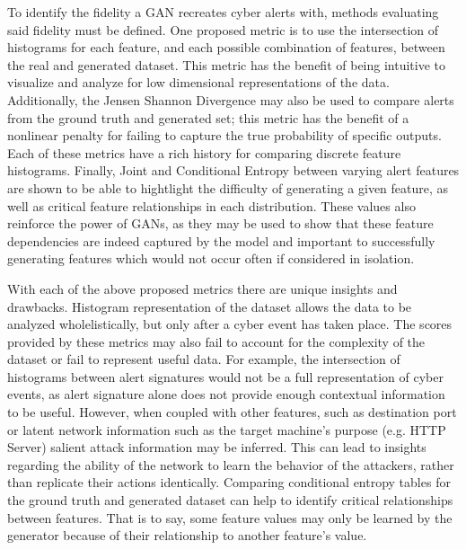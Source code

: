 To identify the fidelity a GAN recreates cyber alerts with, methods evaluating said fidelity must be defined. One proposed metric is to use the intersection of histograms for each feature, and each possible combination of features, between the real and generated dataset. This metric has the benefit of being intuitive to visualize and analyze for low dimensional representations of the data. Additionally, the Jensen Shannon Divergence may also be used to compare alerts from the ground truth and generated set; this metric has the benefit of a nonlinear penalty for failing to capture the true probability of specific outputs. Each of these metrics have a rich history for comparing discrete feature histograms. Finally, Joint and Conditional Entropy between varying alert features are shown to be able to hightlight the difficulty of generating a given feature, as well as critical feature relationships in each distribution. These values also reinforce the power of GANs, as they may be used to show that these feature dependencies are indeed captured by the model and important to successfully generating features which would not occur often if considered in isolation. 

With each of the above proposed metrics there are unique insights and drawbacks. Histogram representation of the dataset allows the data to be analyzed wholelistically, but only after a cyber event has taken place. The scores provided by these metrics may also fail to account for the complexity of the dataset or fail to represent useful data. For example, the intersection of histograms between alert signatures would not be a full representation of cyber events, as alert signature alone does not provide enough contextual information to be useful. However, when coupled with other features, such as destination port or latent network information such as the target machine's purpose (e.g. HTTP Server) salient attack information may be inferred. This can lead to insights regarding the ability of the network to learn the behavior of the attackers, rather than replicate their actions identically. Comparing conditional entropy tables for the ground truth and generated dataset can help to identify critical relationships between features. That is to say, some feature values may only be learned by the generator because of their relationship to another feature's value.
